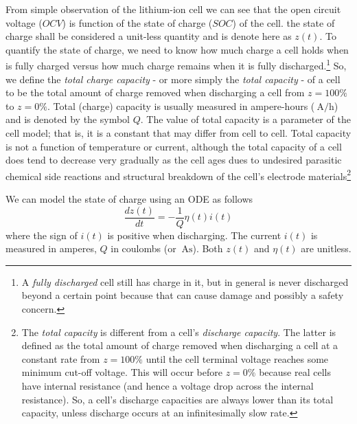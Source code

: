 \documentclass[11pt,a4paper]{article}
\numberwithin{equation}{section}
\theoremstyle{it}
\theoremstyle{definition}
\begin{document}
From simple observation of the lithium-ion cell we can see that the open circuit voltage ($OCV$) is function of the state of charge ($SOC$) of the cell. the state of charge shall be considered a unit-less quantity and is denote here as $z(t)$. To quantify the state of charge, we need to know how much charge a cell holds when is fully charged versus how much charge remains when it is fully discharged.\footnote{A \textit{fully discharged} cell still has charge in it, but in general is never discharged beyond a certain point because that can cause damage and possibly a safety concern.} So, we define the \textit{total charge capacity} - or more simply the \textit{total capacity} - of a cell to be the total amount of charge removed when discharging a cell from $z=100\%$ to $z=0\%$. Total (charge) capacity is usually measured in ampere-hours ($\SI{}{\ampere\per\hour}$) and is denoted by the symbol $Q$. The value of total capacity is a parameter of the cell model; that is, it is a constant that may differ from cell to cell. Total capacity is not a function of temperature or current, although the total capacity of a cell does tend to decrease very gradually as the cell ages dues to undesired parasitic chemical side reactions and structural breakdown of the cell's electrode materials\footnote{The \textit{total capacity} is different from a cell's \textit{discharge capacity}. The latter is defined as the total amount of charge removed when discharging a cell at a constant rate from $z=100\%$ until the cell terminal voltage reaches some minimum cut-off voltage. This will occur before $z=0\%$ because real cells have internal resistance (and hence a voltage drop across the internal resistance). So, a cell's discharge capacities are always lower than its total capacity, unless discharge occurs at an infinitesimally slow rate.}

We can model the state of charge using an ODE as follows
\begin{equation}
	\frac{dz(t)}{dt} = -\frac{1}{Q}\eta(t)i(t)
\end{equation}
where the sign of $i(t)$ is positive when discharging. The current $i(t)$ is measured in amperes, $Q$ in coulombs (or $\SI{}{\ampere\second}$). Both $z(t)$ and $\eta(t)$ are unitless.
\end{document}
